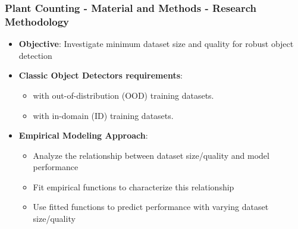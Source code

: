 \documentclass[aspectratio=43]{beamer}
\begin{document}
\begin{frame}
    \frametitle{Plant Counting - Material and Methods - Research Methodology}
    \small
    \begin{itemize}
        \item \textbf{Objective}: Investigate minimum dataset size and quality for robust object detection
        \item \textbf{Classic Object Detectors requirements}:
            \begin{itemize}
                \item with out-of-distribution (OOD) training datasets.
                \item with in-domain (ID) training datasets.
            \end{itemize} 
        \item \textbf{Empirical Modeling Approach}:
            \begin{itemize}
                \item Analyze the relationship between dataset size/quality and model performance
                \item Fit empirical functions to characterize this relationship
                \item Use fitted functions to predict performance with varying dataset size/quality
            \end{itemize}
    \end{itemize}
\end{frame}
\end{document}
